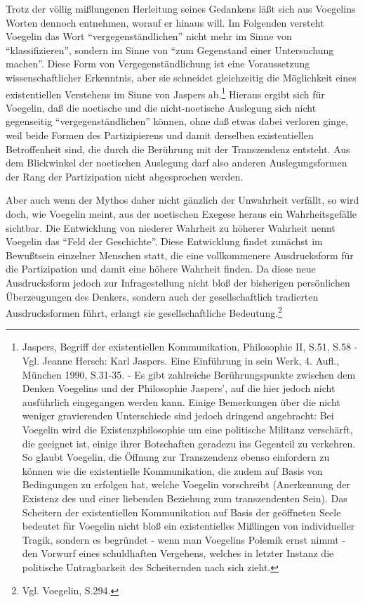 Trotz der völlig mißlungenen Herleitung seines Gedankens läßt sich aus
Voegelins Worten dennoch entnehmen, worauf er hinaus will. Im Folgenden
versteht Voegelin das Wort "`vergegenständlichen"' nicht mehr im Sinne von
"`klassifizieren"', sondern im Sinne von "`zum Gegenstand einer Untersuchung
machen"'. Diese Form von Vergegenständlichung ist eine Voraussetzung
wissenschaftlicher Erkenntnis, aber sie schneidet gleichzeitig die Möglichkeit
eines existentiellen Verstehens im Sinne von Jaspers ab.\footnote{Jaspers,
  Begriff der existentiellen Kommunikation, Philosophie II, S.51, S.58 - Vgl.
  Jeanne Hersch: Karl Jaspers. Eine Einführung in sein Werk, 4. Aufl., München
  1990, S.31-35. - Es gibt zahlreiche Berührungspunkte zwischen dem Denken
  Voegelins und der Philosophie Jaspers', auf die hier jedoch nicht
  ausführlich eingegangen werden kann. Einige Bemerkungen über die nicht
  weniger gravierenden Unterschiede sind jedoch dringend angebracht: Bei
  Voegelin wird die Existenzphilosophie um eine politische Militanz
  verschärft, die geeignet ist, einige ihrer Botschaften geradezu ins
  Gegenteil zu verkehren. So glaubt Voegelin, die Öffnung zur Transzendenz
  ebenso einfordern zu können wie die existentielle Kommunikation, die zudem
  auf Basis von Bedingungen zu erfolgen hat, welche Voegelin vorschreibt
  (Anerkennung der Existenz des und einer liebenden Beziehung zum
  transzendenten Sein). Das Scheitern der existentiellen Kommunikation auf
  Basis der geöffneten Seele bedeutet für Voegelin nicht bloß ein
  existentielles Mißlingen von individueller Tragik, sondern es begründet -
  wenn man Voegelins Polemik ernst nimmt - den Vorwurf eines schuldhaften
  Vergehens, welches in letzter Instanz die politische Untragbarkeit des
  Scheiternden nach sich zieht.} Hieraus ergibt sich für Voegelin, daß die
noetische und die nicht-noetische Auslegung sich nicht gegenseitig
"`vergegenständlichen"' können, ohne daß etwas dabei verloren ginge, weil
beide Formen des Partizipierens und damit derselben existentiellen
Betroffenheit sind, die durch die Berührung mit der Transzendenz entsteht. Aus
dem Blickwinkel der noetischen Auslegung darf also anderen Auslegungsformen
der Rang der Partizipation nicht abgesprochen werden.
 
Aber auch wenn der Mythos daher nicht gänzlich der Unwahrheit verfällt, so
wird doch, wie Voegelin meint, aus der noetischen Exegese heraus ein
Wahrheitsgefälle sichtbar. Die Entwicklung von niederer Wahrheit zu höherer
Wahrheit nennt Voegelin das "`Feld der Geschichte"'. Diese Entwicklung findet
zunächst im Bewußtsein einzelner Menschen statt, die eine vollkommenere
Ausdrucksform für die Partizipation und damit eine höhere Wahrheit finden. Da
diese neue Ausdrucksform jedoch zur Infragestellung nicht bloß der bisherigen
persönlichen Überzeugungen des Denkers, sondern auch der gesellschaftlich
tradierten Ausdrucksformen führt, erlangt sie gesellschaftliche
Bedeutung.\footnote{Vgl. Voegelin, S.294.}
 
